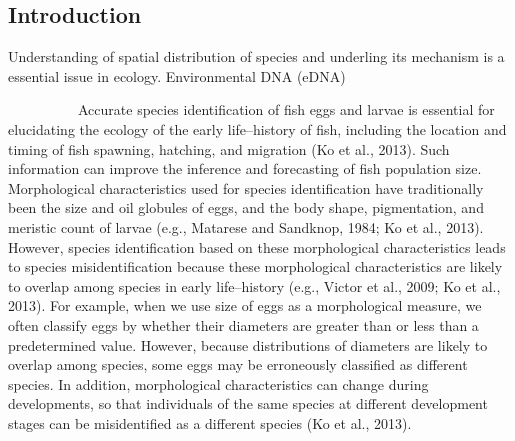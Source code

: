 \documentclass[12pt]{article}
\begin{document}
\newpage
\begin{linenumbers}
\section{Introduction}
Understanding of spatial distribution of species and underling its mechanism is a essential issue in ecology. Environmental DNA (eDNA) 


\ \ \ \ \ \ \ \ \ \
Accurate species identification of fish eggs and larvae is essential for elucidating the ecology of the early life--history of fish, including the location and timing of fish spawning, hatching, and migration (Ko et al., 2013). Such information can improve the inference and forecasting of fish population size. Morphological characteristics used for species identification have traditionally been the size and oil globules of eggs, and the body shape, pigmentation, and meristic count of larvae (e.g., Matarese and Sandknop, 1984; Ko et al., 2013). However, species identification based on these morphological characteristics leads to species misidentification because these morphological characteristics are likely to overlap among species in early life--history (e.g., Victor et al., 2009; Ko et al., 2013). For example, when we use size of eggs as a morphological measure, we often classify eggs by whether their diameters are greater than or less than a predetermined value. However, because distributions of diameters are likely to overlap among species, some eggs may be erroneously classified as different species. In addition, morphological characteristics can change during developments, so that individuals of the same species at different development stages can be misidentified as a different species (Ko et al., 2013).


\end{linenumbers}
\end{document}

